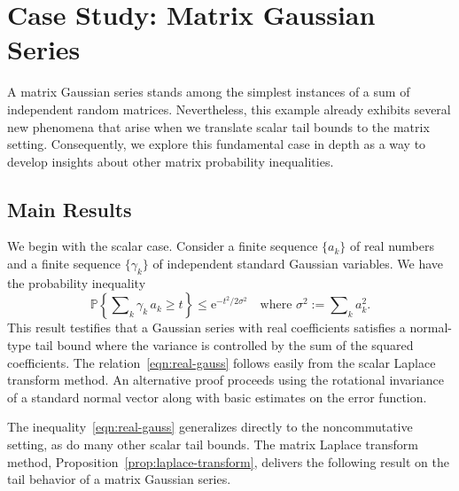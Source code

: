 \documentclass[11pt,letterpaper,twoside,reqno,draft]{amsart}
\theoremstyle{remark}
\numberwithin{equation}{section}
\numberwithin{thm}{section}
\begin{document}
\section{Case Study: Matrix Gaussian Series} \label{sec:rademacher}

A matrix Gaussian series stands among the simplest instances of a sum of independent random matrices.  Nevertheless, this example already exhibits several new phenomena that arise when we translate scalar tail bounds to the matrix setting.  Consequently, we explore this fundamental case in depth as a way to develop insights about other matrix probability inequalities.

\subsection{Main Results}

We begin with the scalar case.  Consider a finite sequence $\{a_k\}$ of real numbers and a finite sequence $\{\gamma_k\}$ of independent standard Gaussian variables.  We have the probability inequality
\begin{equation} \label{eqn:real-gauss}
{\mathbb{P}\left\{ {{ \sum\nolimits_{k} \gamma_k \, a_k \geq t }} \right\}}
	\leq {\mathrm{e}}^{- t^2 / 2\sigma^2 }
\quad\text{where $\sigma^2 := \sum\nolimits_{k} a_k^2$.}
\end{equation}
This result testifies that a Gaussian series with real coefficients satisfies a normal-type tail bound where the variance is controlled by the sum of the squared coefficients.
The relation~\eqref{eqn:real-gauss} follows easily from the scalar Laplace transform method.  An alternative proof proceeds using the rotational invariance of a standard normal vector along with basic estimates on the error function.

The inequality~\eqref{eqn:real-gauss} generalizes directly to the noncommutative setting, as do many other scalar tail bounds.  The matrix Laplace transform method, Proposition~\ref{prop:laplace-transform}, delivers the following result on the tail behavior of a matrix Gaussian series.
\end{document}
